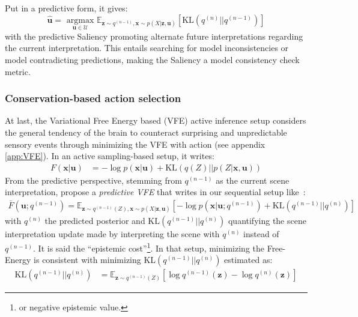 \documentclass[12pt,twoside,openright]{article}
\begin{document}
Put in a predictive form, it gives:
$$ \hat{\boldsymbol{u}} = \underset{\boldsymbol{u} \in \mathcal{U}}{\text{ argmax }} \mathbb{E}_{\boldsymbol{z} \sim q^{(n-1)}, \boldsymbol{x} \sim p(X|\boldsymbol{z}, \boldsymbol{u})}\left[\text{KL}(q^{(n)}||q^{(n-1)})\right]$$
{\color{Purple} with the predictive Saliency promoting alternate future interpretations regarding the current interpretation. This entails searching for model inconsistencies or model contradicting predictions, making the Saliency a model consistency check metric.}

\subsubsection{Conservation-based action selection}\label{sec:conservation}

At last, the  Variational Free Energy based (VFE) active inference setup \citep{friston2010free,friston2012perceptions} 
considers the general tendency of the brain to counteract surprising and unpredictable sensory events through minimizing the VFE with action (see appendix \ref{app:VFE}). In an active sampling-based setup, it writes:
\begin{align}
F(\boldsymbol{x}|\boldsymbol{u}) 
&= -\log p(\boldsymbol{x}|\boldsymbol{u}) + \text{KL}(q(Z)||p(Z|\boldsymbol{x},\boldsymbol{u}))
\label{eq:FEP-posterior-u}
\end{align}
From the predictive perspective, stemming from $q^{(n-1)}$ as the current scene interpretation, \citet{friston2017active} propose a \emph{predictive VFE} that writes in our sequential setup like~:
\begin{align}
\bar{F}(\boldsymbol{u}; q^{(n-1)}) = \mathbb{E}_{\boldsymbol{z} \sim q^{(n-1)}(Z), \boldsymbol{x} \sim p(X|\boldsymbol{z}, \boldsymbol{u})}
\left[-\log p(\boldsymbol{x}| \boldsymbol{u}; q^{(n-1)}) + \text{KL}(q^{(n-1)}||q^{(n)})\right]
\label{eq:ELBO}
\end{align}
with $q^{(n)}$ the predicted posterior and $\text{KL}(q^{(n-1)}||q^{(n)})$ quantifying the {\color{Purple} scene interpretation update} made by interpreting  the scene with $q^{(n)}$ instead of $q^{(n-1)}$. {\color{Purple} It is said the ``epistemic cost''\footnote{or negative epistemic value.}}.
In that setup, minimizing the Free-Energy is consistent with minimizing $\text{KL}(q^{(n-1)}||q^{(n)})$
estimated as:
\begin{align*}
\text{KL}(q^{(n-1)}||q^{(n)})
&= \mathbb{E}_{\boldsymbol{z} \sim q^{(n-1)}(Z)} \left[\log q^{(n-1)}(\boldsymbol{z}) - \log q^{(n)}(\boldsymbol{z})\right]
\end{align*}
\end{document}
